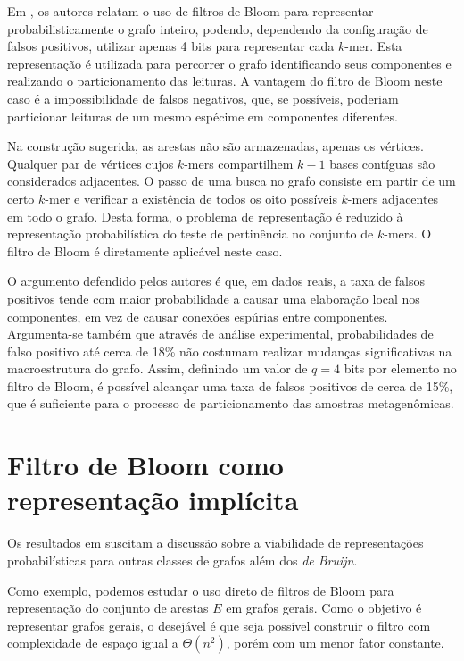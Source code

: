 Em \cite{pell2012scaling}, os autores relatam o uso de filtros de Bloom para representar probabilisticamente o grafo inteiro, podendo, dependendo da configuração de falsos positivos, utilizar apenas 4 bits para representar cada $k$-mer. Esta representação é utilizada para percorrer o grafo identificando seus componentes e realizando o particionamento das leituras. A vantagem do filtro de Bloom neste caso é a impossibilidade de falsos negativos, que, se possíveis, poderiam particionar leituras de um mesmo espécime em componentes diferentes.

Na construção sugerida, as arestas não são armazenadas, apenas os vértices. Qualquer par de vértices cujos $k$-mers compartilhem $k-1$ bases contíguas são considerados adjacentes. O passo de uma busca no grafo consiste em partir de um certo $k$-mer e verificar a existência de todos os oito possíveis $k$-mers adjacentes em todo o grafo. Desta forma, o problema de representação é reduzido à representação probabilística do teste de pertinência no conjunto de $k$-mers. O filtro de Bloom é diretamente aplicável neste caso.

O argumento defendido pelos autores é que, em dados reais, a taxa de falsos positivos tende com maior probabilidade a causar uma elaboração local nos componentes, em vez de causar conexões espúrias entre componentes. Argumenta-se também que através de análise experimental, probabilidades de falso positivo até cerca de 18\% não costumam realizar mudanças significativas na macroestrutura do grafo. Assim, definindo um valor de $q = 4$ bits por elemento no filtro de Bloom, é possível alcançar uma taxa de falsos positivos de cerca de 15\%, que é suficiente para o processo de particionamento das amostras metagenômicas.


\section{Filtro de Bloom como representação implícita}\label{sec:graphs:bloom}

Os resultados em \cite{pell2012scaling} suscitam a discussão sobre a viabilidade de representações probabilísticas para outras classes de grafos além dos \emph{de Bruijn}.

Como exemplo, podemos estudar o uso direto de filtros de Bloom para representação do conjunto de arestas $E$ em grafos gerais. Como o objetivo é representar grafos gerais, o desejável é que seja possível construir o filtro com complexidade de espaço igual a $\Theta(n^2)$, porém com um menor fator constante.

